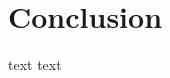 \documentclass[10pt,journal,cspaper,compsoc]{IEEEtran}
\begin{document}
\section{Conclusion}\label{s:conclusion}

text text





%



\end{document}
